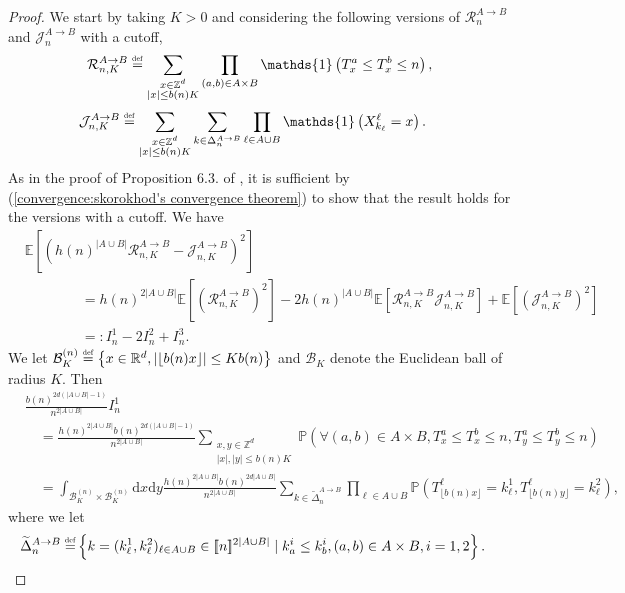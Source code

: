 \documentclass[10pt,a4paper]{amsart}
\newcommand{\RR}{\mathbb R}
\newcommand{\EE}{\mathbb E}
\newcommand{\PP}{\mathbb P}
\newcommand{\1}{\mathds{1}}
\newcommand{\ZZ}{\mathbb Z}
\renewcommand{\d}{\mathrm d}
\newcommand{\eqdef}{\stackrel{\scaleto{\mathrm{def}}{3.5pt}}{=}}
\numberwithin{equation}{section}
\begin{document}
\begin{proof}
    We start by taking $K>0$ and considering the following versions of $\mathcal R_n^{A\rightarrow B}$ and $\mathcal J_n^{A\rightarrow B}$ with a cutoff,
    \begin{equation*}
        \mathcal R_{n,K}^{A\rightarrow B}\eqdef\sum_{\substack{x\in\ZZ^d \\ |x|\le b(n)K}}\prod_{(a,b)\in A\times B}\1\left(T_x^a\le T_x^b\le n\right),
    \end{equation*}
    \begin{align*}
        \mathcal J_{n,K}^{A\rightarrow B}&\eqdef\sum_{\substack{x\in\ZZ^d \\ |x|\le b(n) K}}\sum_{k\in\Delta_n^{A\rightarrow B}}\prod_{\ell\in A\cup B}\1\left(X_{k_\ell}^{\ell}=x\right).
    \end{align*}
    As in the proof of Proposition $6.3.$ of \cite{LeGallRosenRangeOfStableRandomWalks1991}, it is sufficient by (\ref{convergence:skorokhod's convergence theorem}) to show that the result holds for the versions with a cutoff. We have
    \begin{align*}
        &\EE\left[\left(h(n)^{|A\cup B|}\mathcal R_{n,K}^{A\rightarrow B}-\mathcal J_{n,K}^{A\rightarrow B}\right)^2\right]\\
        &\hspace{4em}=h(n)^{2|A\cup B|}\EE\left[\left(\mathcal R_{n,K}^{A\rightarrow B}\right)^2\right]-2h(n)^{|A\cup B|}\EE\left[\mathcal R_{n,K}^{A\rightarrow B}\mathcal J_{n,K}^{A\rightarrow B}\right]+\EE\left[\left(\mathcal J_{n,K}^{A\rightarrow B}\right)^2\right]\\
        &\hspace{4em}=:I_n^1-2I_n^2+I_n^3.
    \end{align*}
    We let $\mathcal B_{K}^{(n)}\eqdef\left\{x\in\RR^d, |\lfloor b(n) x\rfloor|\le K b(n)\right\}$ and $\mathcal B_K$ denote the Euclidean ball of radius $K$. Then
    \begin{align}
        &\frac{b(n)^{2d(|A\cup B|-1)}}{n^{2|A\cup B|}}I_n^1\nonumber\\
        &\hspace{1em}=\frac{h(n)^{2|A\cup B|}b(n)^{2d(|A\cup B|-1)}}{n^{2|A\cup B|}}\sum_{\substack{x,y\in\ZZ^d \\ |x|,|y|\le b(n) K}}\PP\left(\forall(a,b)\in A\times B,T_x^{a}\le T_x^{b}\le n, T_y^{a}\le T_y^{b}\le n\right)\nonumber\\
        &\hspace{1em}=\int_{\mathcal B_K^{(n)}\times\mathcal B_K^{(n)}}\d x\d y\frac{h(n)^{2|A\cup B|}b(n)^{2d|A\cup B|}}{n^{2|A\cup B|}}\sum_{k\in\widetilde\Delta_n^{A\rightarrow B}}\prod_{\ell\in A\cup B}\PP\left(T_{\lfloor b(n)x\rfloor}^{\ell}=k^1_{\ell},T_{\lfloor b(n)y\rfloor}^{\ell}=k_\ell^2\right),\label{eq:modified expression of I_n^1}
    \end{align}
    where we let 
    \begin{align*}
        \widetilde \Delta_n^{A\rightarrow B}\eqdef&\left\{k=(k_\ell^1,k_\ell^2)_{\ell\in A\cup B}\in[\![n]\!]^{2|A\cup B|}\mid k^i_{a}\le k^i_{{b}}, (a,b)\in A\times B, i=1,2\right\}.
    \end{align*}


\end{proof}
\end{document}
